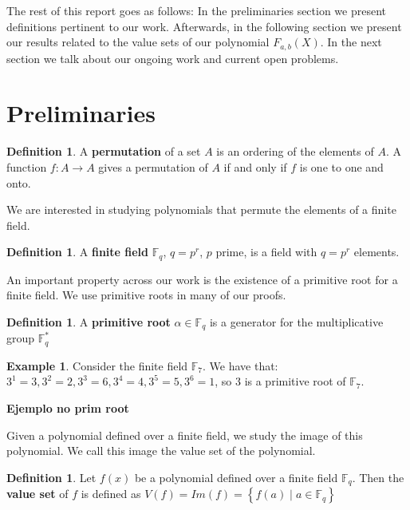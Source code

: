 \documentclass{article}
\theoremstyle{definition}
\newtheorem{definition}[theorem]{Definition}
\newtheorem{example}[theorem]{Example}
\theoremstyle{remark}
\numberwithin{equation}{section}
\begin{document}
The rest of this report goes as follows: In the preliminaries section we present definitions pertinent to our work. Afterwards, in the following section we present our results related to the value sets of our polynomial $F_{a,b}(X)$. In the next section we talk about our ongoing work and current open problems.

\section{Preliminaries}



\begin{definition}
  A \textbf{permutation} of a set $A$ is an ordering of the elements of $A$. A function $f: A \rightarrow A$ gives a permutation of $A$ if and only if $f$ is one to one and onto.
\end{definition}

We are interested in studying polynomials that permute the elements of a finite field.

\begin{definition}
  A \textbf{finite field} $\mathbb{F}_{q}$, $q=p^r$, $p$ prime, is a field with $q=p^r$ elements.
\end{definition}

An important property across our work is the existence of a primitive root for a finite field. We use primitive roots in many of our proofs.

\begin{definition}
  A \textbf{primitive root} $\alpha \in \mathbb{F}_q$ is a generator for the multiplicative group $\mathbb{F}_{q}^{*}$
\end{definition}

\begin{example}
  Consider the finite field $\mathbb{F}_{7}$. We have that: $3^1 = 3, 3^2 = 2, 3^3 = 6, 3^4 = 4, 3^5 = 5, 3^6 = 1$, so $3$ is a primitive root of $\mathbb{F}_{7}$.
\end{example}

\textbf{Ejemplo no prim root}

Given a polynomial defined over a finite field, we study the image of this polynomial. We call this image the value set of the polynomial.

\begin{definition}
  Let $f(x)$ be a polynomial defined over a finite field $\mathbb{F}_{q}$. Then the \textbf{value set} of $f$ is defined as $V(f) = Im(f) = \left\{f(a) \mid a \in \mathbb{F}_{q} \right\}$
\end{definition}
\end{document}
